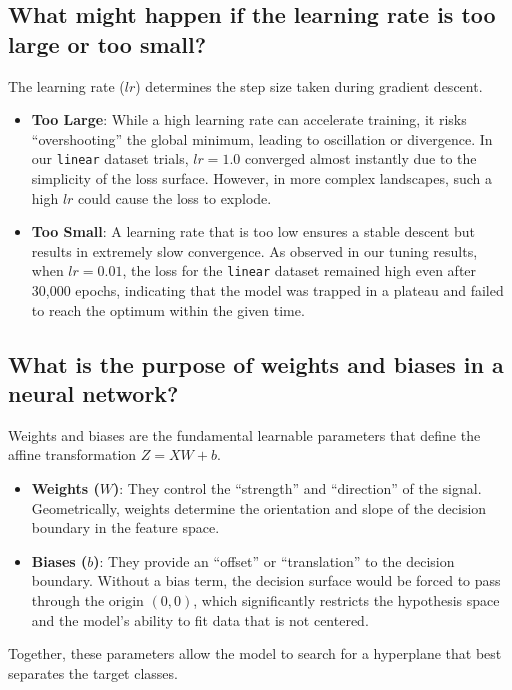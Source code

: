 \documentclass[10pt,twocolumn,letterpaper]{article}
\begin{document}
\subsection{What might happen if the learning rate is too large or too small?}
The learning rate ($lr$) determines the step size taken during gradient descent. 

\begin{itemize}
    \item \textbf{Too Large}: While a high learning rate can accelerate training, it risks ``overshooting'' the global minimum, leading to oscillation or divergence. In our \texttt{linear} dataset trials, $lr=1.0$ converged almost instantly due to the simplicity of the loss surface. However, in more complex landscapes, such a high $lr$ could cause the loss to explode.
    \item \textbf{Too Small}: A learning rate that is too low ensures a stable descent but results in extremely slow convergence. As observed in our tuning results, when $lr=0.01$, the loss for the \texttt{linear} dataset remained high even after 30,000 epochs, indicating that the model was trapped in a plateau and failed to reach the optimum within the given time.
\end{itemize}

\subsection{What is the purpose of weights and biases in a neural network?}
Weights and biases are the fundamental learnable parameters that define the affine transformation $Z = XW + b$.

\begin{itemize}
    \item \textbf{Weights ($W$)}: They control the ``strength'' and ``direction'' of the signal. Geometrically, weights determine the orientation and slope of the decision boundary in the feature space.
    \item \textbf{Biases ($b$)}: They provide an ``offset'' or ``translation'' to the decision boundary. Without a bias term, the decision surface would be forced to pass through the origin $(0,0)$, which significantly restricts the hypothesis space and the model's ability to fit data that is not centered.
\end{itemize}
Together, these parameters allow the model to search for a hyperplane that best separates the target classes.


% 
% 
\end{document}
